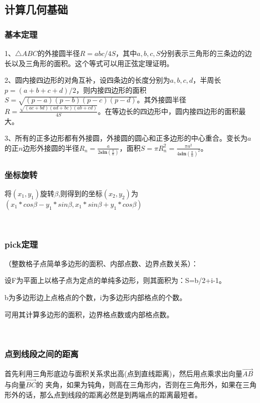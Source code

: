 \subsection{计算几何基础}
\subsubsection{基本定理}
1、$\triangle ABC$的外接圆半径$R=abc/4S$，其中$a,b,c,S$分别表示三角形的三条边的边长以及三角形的面积。这个等式可以用正弦定理证明。\par

2、圆内接四边形的对角互补，设四条边的长度分别为$a,b,c,d$，半周长$p=(a+b+c+d)/2$，则内接四边形的面积$S=\sqrt{(p-a)(p-b)(p-c)(p-d)}$。其外接圆半径$R=\frac{\sqrt{(ac+bd)(ad+bc)(ab+cd)}}{4S}$。在等边长的四边形中，圆内接四边形的面积最大。\par

3、所有的正多边形都有外接圆，外接圆的圆心和正多边形的中心重合。变长为$a$的正$n$边形外接圆的半径$R_n=\frac{a}{2\mathbf{sin}(\frac{\pi}{n})}$，面积$S=\pi R_n^2=\frac{\pi a^2}{4\mathbf{sin}(\frac{\pi}{n})^2}$。 \par

\subsubsection{坐标旋转}
将$(x_1,y_1)$旋转$\beta$,则得到的坐标$(x_2,y_2)$为$(x_1*cos\beta-y_1*sin\beta,x_1*sin\beta+y_1*cos\beta)$

~\\

\subsubsection{pick定理}
（整数格子点简单多边形的面积、内部点数、边界点数关系）：\par
设F为平面上以格子点为定点的单纯多边形，则其面积为：S=b/2+i-1。 \par
b为多边形边上点格点的个数，i为多边形内部格点的个数。 \par
可用其计算多边形的面积，边界格点数或内部格点数。 \par

~\\

\subsubsection{点到线段之间的距离}
首先利用三角形底边与面积关系求出高(点到直线距离)，然后用点乘求出向量$\overrightarrow{AB}$与向量$\overrightarrow{BC}$的
夹角，如果为钝角，则高在三角形内，否则在三角形外，如果在三角形外的话，那么点到线段的距离必然是到两端点的距离最短者。\par

